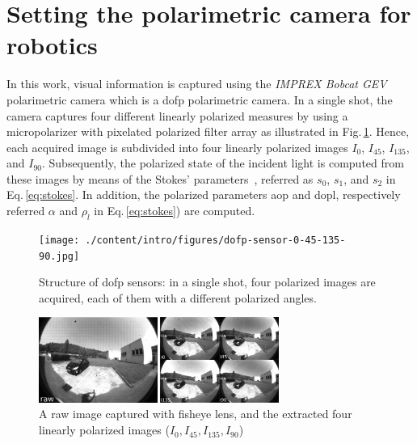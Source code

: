 \graphicspath{{./content/intro/figures/}}
\section{Setting the polarimetric camera for robotics}
\label{sec:rosify}

In this work, visual information is captured using the \emph{IMPREX Bobcat GEV}
polarimetric camera which is a \gls{dofp} polarimetric camera. In a single shot,
the camera captures four different linearly polarized measures by using
a micropolarizer with pixelated polarized filter array as illustrated in
Fig.\,\ref{fig:dofp-sensor}. Hence, each acquired image is subdivided into four
linearly polarized images $I_0$, $I_{45}$, $I_{135}$, and
$I_{90}$. Subsequently, the polarized state of the incident light is computed
from these images by means of the Stokes'
parameters~\cite{goldstein2017polarized}, referred as $s_0$, $s_1$, and $s_2$
in Eq.\,\ref{eq:stokes}. In addition, the polarized parameters \gls{aop} and
\gls{dopl}, respectively referred $\alpha$ and $\rho_l$ in
Eq.\,\ref{eq:stokes}) are computed.


\begin{figure}
  \centering
  \texttt{[image: ./content/intro/figures/dofp-sensor-0-45-135-90.jpg]}
  \caption{Structure of \gls{dofp} sensors: in a single shot, four polarized
    images are acquired, each of them with a different polarized angles.}
    \label{fig:dofp-sensor}
\end{figure}

\begin{figure}
  \centering
  \includegraphics[width=0.7\textwidth]{./content/intro/figures/raw-sp.jpg}
  \caption{A raw image captured with fisheye lens, and the extracted four
    linearly polarized images ($I_0, I_{45}, I_{135}, I_{90}$)}
  \label{fig:raw-sp}
\end{figure}

